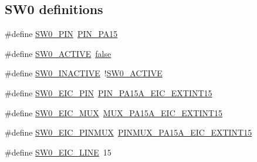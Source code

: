 \subsection*{S\+W0 definitions}
\begin{DoxyCompactItemize}
\item 
\#define \mbox{\hyperlink{group__samd21__xplained__pro__features__group_ga1db7ea1df7a18b3749ee2eaaa2f2d0af}{S\+W0\+\_\+\+P\+IN}}~\mbox{\hyperlink{pio_2samd21j18a_8h_abaad308f0408bf5d3f1fe558f3d26e5e}{P\+I\+N\+\_\+\+P\+A15}}
\item 
\#define \mbox{\hyperlink{group__samd21__xplained__pro__features__group_gac534d0b05a26a80e6e8e83a049b80655}{S\+W0\+\_\+\+A\+C\+T\+I\+VE}}~\mbox{\hyperlink{group__group__sam0__utils_ga65e9886d74aaee76545e83dd09011727}{false}}
\item 
\#define \mbox{\hyperlink{group__samd21__xplained__pro__features__group_ga74eeefc6abe579addaec6ac2bff4d080}{S\+W0\+\_\+\+I\+N\+A\+C\+T\+I\+VE}}~!\mbox{\hyperlink{group__samd21__xplained__pro__features__group_gac534d0b05a26a80e6e8e83a049b80655}{S\+W0\+\_\+\+A\+C\+T\+I\+VE}}
\item 
\#define \mbox{\hyperlink{group__samd21__xplained__pro__features__group_gac9d5ae203ecf805717134dfcee12372b}{S\+W0\+\_\+\+E\+I\+C\+\_\+\+P\+IN}}~\mbox{\hyperlink{pio_2samd21j18a_8h_a6cf6ad0634cbb035d1c78c40cfc0ed7e}{P\+I\+N\+\_\+\+P\+A15\+A\+\_\+\+E\+I\+C\+\_\+\+E\+X\+T\+I\+N\+T15}}
\item 
\#define \mbox{\hyperlink{group__samd21__xplained__pro__features__group_ga18b3e713457ceaf39e36dbccd8f200fa}{S\+W0\+\_\+\+E\+I\+C\+\_\+\+M\+UX}}~\mbox{\hyperlink{pio_2samd21j18a_8h_a4454df2977df5f5052c8cfa9aa7bb949}{M\+U\+X\+\_\+\+P\+A15\+A\+\_\+\+E\+I\+C\+\_\+\+E\+X\+T\+I\+N\+T15}}
\item 
\#define \mbox{\hyperlink{group__samd21__xplained__pro__features__group_ga27bc87cdd4caabcd3160ae3a03f297c7}{S\+W0\+\_\+\+E\+I\+C\+\_\+\+P\+I\+N\+M\+UX}}~\mbox{\hyperlink{pio_2samd21j18a_8h_aa82833fe8b0e407c256328205ffa03a7}{P\+I\+N\+M\+U\+X\+\_\+\+P\+A15\+A\+\_\+\+E\+I\+C\+\_\+\+E\+X\+T\+I\+N\+T15}}
\item 
\#define \mbox{\hyperlink{group__samd21__xplained__pro__features__group_ga202edaf3ad972f409e83a1fab0f19579}{S\+W0\+\_\+\+E\+I\+C\+\_\+\+L\+I\+NE}}~15
\end{DoxyCompactItemize}
